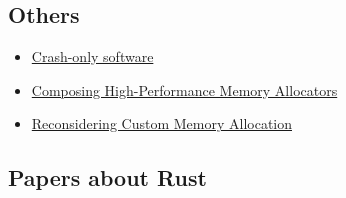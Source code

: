 \subsection*{Others}

\begin{itemize}
  \item{\href{https://www.usenix.org/legacy/events/hotos03/tech/full\_papers/candea/candea.pdf}{Crash-only software}}
  \item{\href{http://people.cs.umass.edu/\%7Eemery/pubs/berger-pldi2001.pdf}{Composing High-Performance Memory Allocators}}
  \item{\href{http://people.cs.umass.edu/\%7Eemery/pubs/berger-oopsla2002.pdf}{Reconsidering Custom Memory Allocation}}
\end{itemize}

\subsection*{Papers about Rust}

